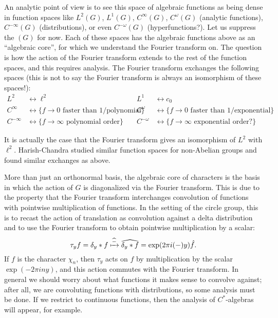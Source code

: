 \documentclass[11pt,leqno]{article}
\theoremstyle{plain}
\theoremstyle{definition}
\numberwithin{equation}{section}
\numberwithin{lem}{section}
\begin{document}
An analytic point of view is to see this space of algebraic functions as being dense in function spaces like $L^2(G)$, $L^1(G)$, $C^\infty(G)$, $C^\omega(G)$ (analytic functions), $C^{-\infty}(G)$ (distributions), or even $C^{-\omega}(G)$ (hyperfunctions?). Let us suppress the $(G)$ for now. Each of these spaces has the algebraic functions above as an ``algebraic core'', for which we understand the Fourier transform on. The question is how the action of the Fourier transform extends to the rest of the function spaces, and this requires analysis. The Fourier transform exchanges the following spaces (this is not to say the Fourier transform is always an isomorphism of these spaces!):
\begin{align*}
	L^2 &\longleftrightarrow \ell^2 & L^1 &\longleftrightarrow c_0\\
	C^\infty &\longleftrightarrow \{f\to 0 \text{ faster than } 1/\text{polynomial}\} & C^\omega &\longleftrightarrow \{f\to 0 \text{ faster than } 1/\text{exponential}\}\\
	C^{-\infty} &\longleftrightarrow \{f\to \infty \text{ polynomial order}\} & C^{-\omega} &\longleftrightarrow \{f\to \infty \text{ exponential order?}\}
\end{align*}

It is actually the case that the Fourier transform gives an isomorphism of $L^2$ with $\ell^2$. Harish-Chandra studied similar function spaces for non-Abelian groups and found similar exchanges as above.

More than just an orthonormal basis, the algebraic core of characters is the basis in which the action of $G$ is diagonalized via the Fourier transform. This is due to the property that the Fourier transform interchanges convolution of functions with pointwise multiplication of functions. In the setting of the circle group, this is to recast the action of translation as convolution against a delta distribution and to use the Fourier transform to obtain pointwise multiplication by a scalar:
\[\tau_yf = \delta_y\ast f\xmapsto{\widehat{-}} \widehat{\delta_y\ast f} = \exp(2\pi i(-)y)\hat f.\]
If $f$ is the character $\chi_n$, then $\tau_y$ acts on $f$ by multiplication by the scalar $\exp(-2\pi iny)$, and this action commutes with the Fourier transform. In general we should worry about what functions it makes sense to convolve against; after all, we are convoluting functions with distributions, so some analysis must be done. If we restrict to continuous functions, then the analysis of $C^\ast$-algebras will appear, for example.
\end{document}
